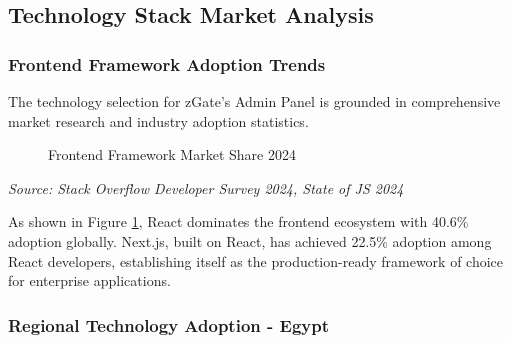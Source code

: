 \subsection{Technology Stack Market Analysis}

\subsubsection{Frontend Framework Adoption Trends}

The technology selection for zGate's Admin Panel is grounded in comprehensive market research and industry adoption statistics.

\begin{figure}[H]
\centering
{}
\caption{Frontend Framework Market Share 2024}
\label{fig:framework-adoption}
\end{figure}

\textit{Source: Stack Overflow Developer Survey 2024, State of JS 2024}

\vspace{0.3cm}

As shown in Figure \ref{fig:framework-adoption}, React dominates the frontend ecosystem with 40.6\% adoption globally. Next.js, built on React, has achieved 22.5\% adoption among React developers, establishing itself as the production-ready framework of choice for enterprise applications.

\subsubsection{Regional Technology Adoption - Egypt}

